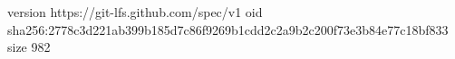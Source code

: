 version https://git-lfs.github.com/spec/v1
oid sha256:2778c3d221ab399b185d7c86f9269b1cdd2c2a9b2c200f73e3b84e77c18bf833
size 982
